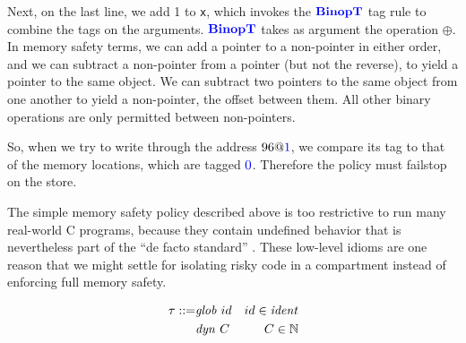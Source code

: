 \documentclass{llncs}
\begin{document}
\vspace{\abovedisplayskip}

Next, on the last line, we add 1 to {\tt x}, which invokes the \(\color{blue} \mathbf{BinopT}\) tag rule
to combine the tags on the arguments. \(\color{blue} \mathbf{BinopT}\) takes as argument the operation \(\oplus\).
In memory safety terms, we can add a pointer to a non-pointer in either order, and we can subtract
a non-pointer from a pointer (but not the reverse), to yield a pointer to the same object. We can
subtract two pointers to the same object from one another to yield a non-pointer, the offset between them.
All other binary operations are only permitted between non-pointers.


So, when we try to write through the address \(96@{\color{blue} 1}\), we compare its tag to that of the memory
locations, which are tagged \({\color{blue} 0}\). Therefore the policy must failstop on the store.


The simple memory safety policy described above is too restrictive to run many real-world
C programs, because they contain undefined behavior that is nevertheless part of the
``de facto standard'' \cite{???}. These low-level idioms are one reason that we might
settle for isolating risky code in a compartment instead of enforcing full memory safety.

%
\begin{align*}
  \tau ::= & \mathit{glob} ~ id & id \in \mathit{ident} \\
  & \mathit{dyn} ~ C & C \in \mathbb{N} \\
\end{align*}
\end{document}
